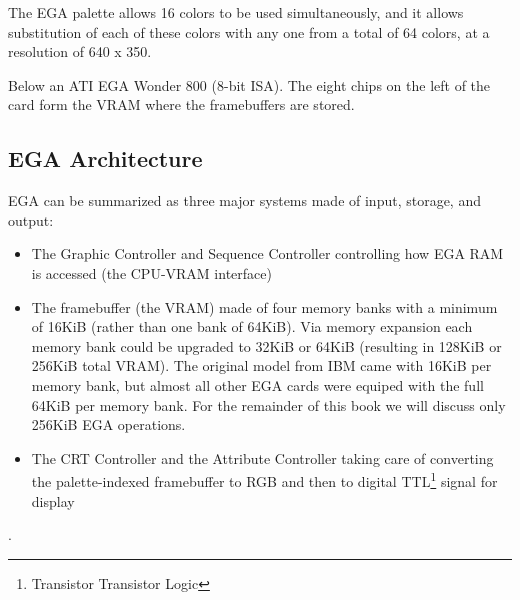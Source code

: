 \documentclass[book.tex]{subfiles}
\begin{document}
The EGA palette allows 16  colors to be used simultaneously, and it allows substitution of each of these colors with any one from a total of 64 colors, at a resolution of 640 x 350.\\
\par
Below an ATI EGA Wonder 800 (8-bit ISA). The eight chips on the left of the card form the VRAM where the framebuffers are stored\protect\footnotemark. 

\begin{figure}[H] 
  \centering 
  
\end{figure}
\par
\pagebreak




\subsection{EGA Architecture}

EGA can be summarized as three major systems made of input, storage, and output:
\begin{itemize}
\item The Graphic Controller and Sequence Controller controlling how EGA RAM is accessed (the CPU-VRAM interface)
\item The framebuffer (the VRAM) made of four memory banks with a minimum of 16KiB (rather than one bank of 64KiB). Via memory expansion each memory bank could be upgraded to 32KiB or 64KiB (resulting in 128KiB or 256KiB total VRAM). The original model from IBM came with 16KiB per memory bank, but almost all other EGA cards were equiped with the full 64KiB per memory bank. For the remainder of this book we will discuss only 256KiB EGA operations.
\item The CRT Controller and the Attribute Controller taking care of converting the palette-indexed framebuffer to RGB and then to digital TTL\footnote{Transistor Transistor Logic} signal for display
\end{itemize}

\par
{}.\\
\end{document}
